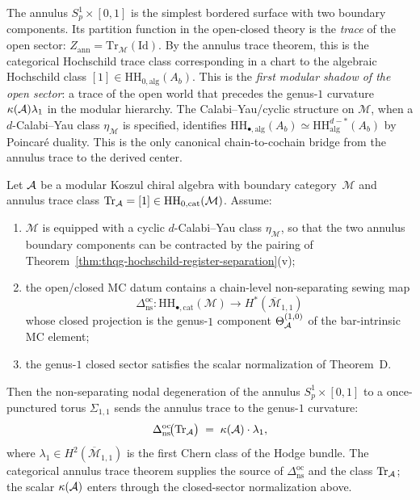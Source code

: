 \begin{remark}
\label{rem:thqg-annulus-first-shadow}
The annulus $S^1_p \times [0, 1]$ is the simplest bordered surface
with two boundary components. Its partition function in the
open-closed theory is the \emph{trace} of the open sector:
$Z_{\mathrm{ann}} = \mathrm{Tr}_{\mathcal{M}}(\mathrm{Id})$.
By the annulus trace theorem, this is the categorical Hochschild
trace class corresponding in a chart to the algebraic Hochschild
class $[1] \in \mathrm{HH}_{0,\mathrm{alg}}(A_b)$.
This is the \emph{first modular shadow of the open sector}: a trace
of the open world that precedes the genus-$1$ curvature
$\kappa(\mathcal{A}) \lambda_1$ in the modular hierarchy. The
Calabi--Yau/cyclic structure on $\mathcal{M}$, when a
$d$-Calabi--Yau class $\eta_{\mathcal M}$ is specified, identifies
$\mathrm{HH}_{\bullet,\mathrm{alg}}(A_b)
\simeq \mathrm{HH}^{d - *}_{\mathrm{alg}}(A_b)$ by Poincar\'e
duality. This is the only canonical chain-to-cochain bridge from
the annulus trace to the derived center.
\end{remark}

\begin{proposition}
\label{prop:thqg-annulus-degeneration-kappa}
Let\/ $\mathcal{A}$ be a modular Koszul chiral algebra with boundary
category~$\mathcal{M}$ and annulus trace class
$\operatorname{Tr}_{\mathcal{A}}
= [1] \in \mathrm{HH}_{0,\mathrm{cat}}(\mathcal{M})$.
Assume:
\begin{enumerate}[label=\textup{(\roman*)}]
\item $\mathcal M$ is equipped with a cyclic
$d$-Calabi--Yau class $\eta_{\mathcal M}$, so that the two
annulus boundary components can be contracted by the pairing
of Theorem~\ref{thm:thqg-hochschild-register-separation}(v);
\item the open/closed MC datum contains a chain-level
non-separating sewing map
\[
\Delta_{\mathrm{ns}}^{\mathrm{oc}}
\colon
\mathrm{HH}_{\bullet,\mathrm{cat}}(\mathcal M)
\longrightarrow
H^*(\overline{\mathcal{M}}_{1,1})
\]
whose closed projection is the genus-$1$ component
$\Theta_{\mathcal{A}}^{(1,0)}$ of the bar-intrinsic MC element;
\item the genus-$1$ closed sector satisfies the scalar
normalization of Theorem~D.
\end{enumerate}
Then the non-separating nodal degeneration of the annulus
$S^1_p \times [0, 1]$ to a once-punctured torus $\Sigma_{1,1}$
sends the annulus trace to the genus-$1$ curvature:
\begin{equation}\label{eq:thqg-annulus-to-kappa}
\Delta_{\mathrm{ns}}^{\mathrm{oc}}\!\bigl(\operatorname{Tr}_{\mathcal{A}}\bigr)
\;=\;
\kappa(\mathcal{A}) \cdot \lambda_1,
\end{equation}
where
$\lambda_1 \in H^2(\overline{\mathcal{M}}_{1,1})$ is the first
Chern class of the Hodge bundle.
The categorical annulus trace theorem supplies the source of
$\Delta_{\mathrm{ns}}^{\mathrm{oc}}$ and the class
$\operatorname{Tr}_{\mathcal{A}}$; the scalar $\kappa(\mathcal{A})$ enters through
the closed-sector normalization above.
\end{proposition}

